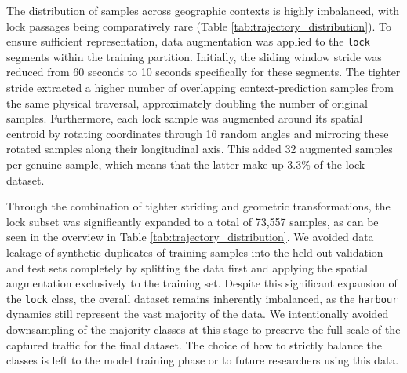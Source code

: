 The distribution of samples across geographic contexts is highly imbalanced, with lock passages being comparatively rare (Table \ref{tab:trajectory_distribution}). %
To ensure sufficient representation, data augmentation was applied to the \texttt{lock} segments within the training partition. %
Initially, the sliding window stride was reduced from 60 seconds to 10 seconds specifically for these segments. The tighter stride extracted a higher number of overlapping context-prediction samples from the same physical traversal, approximately doubling the number of original samples. %
Furthermore, each lock sample was augmented around its spatial centroid by rotating coordinates through 16 random angles and mirroring these rotated samples along their longitudinal axis. This added 32 augmented samples per genuine sample, which means that the latter make up 3.3\% of the lock dataset.

Through the combination of tighter striding and geometric transformations, the lock subset was significantly expanded to a total of 
73,557 samples, as can be seen in the overview in Table \ref{tab:trajectory_distribution}. 
We avoided data leakage of synthetic duplicates of training samples into the held out validation and test sets completely by splitting the data first and applying the spatial augmentation exclusively to the training set.
Despite this significant expansion of the \texttt{lock} class, the overall dataset remains inherently imbalanced, as the \texttt{harbour} dynamics still represent the vast majority of the data. We intentionally avoided downsampling of the majority classes at this stage to preserve the full scale of the captured traffic for the final dataset. The choice of how to strictly balance the classes is left to the model training phase or to future researchers using this data.


